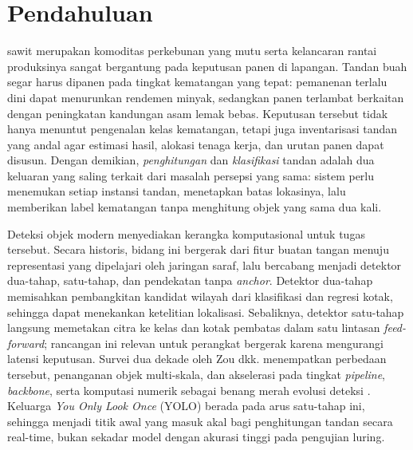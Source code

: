 
\section{Pendahuluan}
 sawit merupakan komoditas perkebunan yang mutu serta
kelancaran rantai produksinya sangat bergantung pada keputusan panen di
lapangan. Tandan buah segar harus dipanen pada tingkat kematangan yang
tepat: pemanenan terlalu dini dapat menurunkan rendemen minyak, sedangkan
panen terlambat berkaitan dengan peningkatan kandungan asam lemak bebas.
Keputusan tersebut tidak hanya menuntut pengenalan kelas kematangan, tetapi
juga inventarisasi tandan yang andal agar estimasi hasil, alokasi tenaga
kerja, dan urutan panen dapat disusun. Dengan demikian, \textit{penghitungan}
dan \textit{klasifikasi} tandan adalah dua keluaran yang saling terkait dari
masalah persepsi yang sama: sistem perlu menemukan setiap instansi tandan,
menetapkan batas lokasinya, lalu memberikan label kematangan tanpa
menghitung objek yang sama dua kali.

Deteksi objek modern menyediakan kerangka komputasional untuk tugas
tersebut. Secara historis, bidang ini bergerak dari fitur buatan tangan
menuju representasi yang dipelajari oleh jaringan saraf, lalu bercabang
menjadi detektor dua-tahap, satu-tahap, dan pendekatan tanpa \textit{anchor}.
Detektor dua-tahap memisahkan pembangkitan kandidat wilayah dari klasifikasi
dan regresi kotak, sehingga dapat menekankan ketelitian lokalisasi. Sebaliknya,
detektor satu-tahap langsung memetakan citra ke kelas dan kotak pembatas
dalam satu lintasan \textit{feed-forward}; rancangan ini relevan untuk
perangkat bergerak karena mengurangi latensi keputusan. Survei dua dekade
oleh Zou dkk. menempatkan perbedaan tersebut, penanganan objek multi-skala,
dan akselerasi pada tingkat \textit{pipeline}, \textit{backbone}, serta
komputasi numerik sebagai benang merah evolusi deteksi \cite{zou2023objectdetectionsurvey}.
Keluarga \textit{You Only Look Once} (YOLO) berada pada arus satu-tahap ini,
sehingga menjadi titik awal yang masuk akal bagi penghitungan tandan secara
real-time, bukan sekadar model dengan akurasi tinggi pada pengujian luring.

